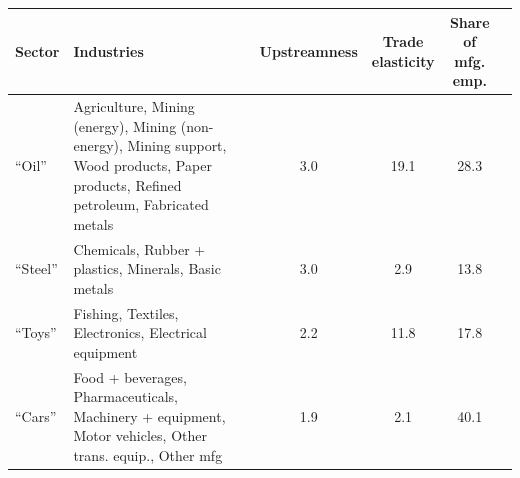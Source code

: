 \begin{tabular}{lp{6cm}cccc}\toprule
Sector & Industries & Upstreamness & \makecell{Trade\\elasticity} & \makecell{Share of\\mfg. emp.}\\
\midrule
\textcolor[HTML]{e41a1c}{``Oil''} & Agriculture, Mining (energy), Mining (non-energy), Mining support, Wood products, Paper products, Refined petroleum, Fabricated metals& 3.0& 19.1& 28.3\\
\textcolor[HTML]{377eb8}{``Steel''} & Chemicals, Rubber + plastics, Minerals, Basic metals& 3.0& 2.9& 13.8\\
\textcolor[HTML]{4daf4a}{``Toys''} & Fishing, Textiles, Electronics, Electrical equipment& 2.2& 11.8& 17.8\\
\textcolor[HTML]{984ea3}{``Cars''} & Food + beverages, Pharmaceuticals, Machinery + equipment, Motor vehicles, Other trans. equip., Other mfg& 1.9& 2.1& 40.1\\
\bottomrule
\end{tabular}